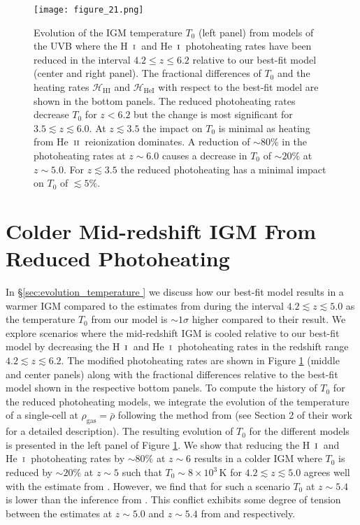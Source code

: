 \documentclass[twocolumn]{aastex62}
\def\HI{\hbox{\rm H~$\scriptstyle\rm I$}}
\def\HeI{\hbox{He~$\scriptstyle\rm I$}}
\def\HeII{\hbox{He~$\scriptstyle\rm II$}}
\begin{document}
\begin{figure*}
\texttt{[image: figure\_21.png]}
\caption{Evolution of the IGM temperature $T_0$ (left panel) from models of the UVB where the \HI\ and \HeI\ photoheating rates have been 
reduced in the interval $4.2 \leq z \leq 6.2$ relative to
our best-fit model (center and right panel). The fractional differences of $T_0$ and 
the heating rates $\mathcal{H}_\mathrm{HI}$ and $\mathcal{H}_\mathrm{HeI}$ with respect to the best-fit model are shown in the bottom panels. 
The reduced photoheating rates decrease $T_0$ for $z< 6.2$ but the change is most significant for $3.5 \lesssim z \lesssim 6.0$.  At $z\lesssim 3.5$
the impact on $T_0$ is minimal as heating from \HeII\ reionization dominates.   A reduction of $\sim 80\%$ in the photoheating rates at $z\sim 6.0$ causes 
a decrease in $T_0$ of $\sim 20\%$ at $z \sim  5.0$. For $z \lesssim 3.5$ the reduced photoheating has a minimal impact on $T_0$ of $\lesssim 5\%$.        }
\label{fig:reduced_heating}
\end{figure*}






\section{ Colder Mid-redshift IGM From Reduced Photoheating  }
\label{sec:colder_IGM}


In \S \ref{sec:evolution_temperature } we discuss how our best-fit  model results in a warmer IGM compared to the estimates from \cite{boera2019a} 
during the interval $4.2 \lesssim z \lesssim 5.0$ as the temperature $T_0$ from our model is $\sim 1\sigma$ higher compared to their result.   We 
explore scenarios where the mid-redshift IGM 
is cooled relative to our best-fit model by decreasing the \HI\ and \HeI\ photoheating
rates in the redshift range $4.2 \lesssim z \lesssim 6.2$. The modified photoheating rates are shown in Figure \ref{fig:reduced_heating} (middle and center panels)
along with the fractional differences relative to 
the best-fit model shown in the respective bottom panels.
To compute the history of $T_0$ for the reduced
photoheating models, we integrate the evolution of the temperature of a single-cell at $\rho_\mathrm{gas}=\bar{\rho}$ following the method from \cite{hui1997a} 
(see Section 2 of their work for a detailed description).  The resulting evolution of $T_0$ for the different models is presented in the left panel of Figure \ref{fig:reduced_heating}.  
We show that reducing the \HI\ and \HeI\ photoheating rates by $\sim 80\%$ at $z\sim 6$ results in a colder IGM where $T_0$ is reduced by $\sim 20\%$ at $z\sim 5$ 
such that $T_0 \sim 8\times 10^3\, \mathrm{K}$ for $4.2 \lesssim z \lesssim 5.0$ agrees well with the estimate from \cite{boera2019a}.
However, we find that for such a scenario
$T_0$ at $z \sim 5.4$ is lower than the inference from \cite{gaikwad2020a}. This conflict exhibits some degree of tension between the estimates  at $z\sim 5.0$ and 
$z \sim 5.4$ from \cite{boera2019a} and \cite{gaikwad2020a} respectively.
\end{document}
